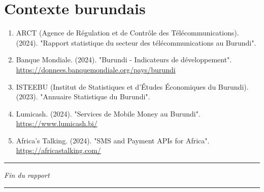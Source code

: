\section{Contexte burundais}

\begin{enumerate}
    \item ARCT (Agence de Régulation et de Contrôle des Télécommunications). (2024). "Rapport statistique du secteur des télécommunications au Burundi".

    \item Banque Mondiale. (2024). "Burundi - Indicateurs de développement". \\
    \url{https://donnees.banquemondiale.org/pays/burundi}

    \item ISTEEBU (Institut de Statistiques et d'Études Économiques du Burundi). (2023). "Annuaire Statistique du Burundi".

    \item Lumicash. (2024). "Services de Mobile Money au Burundi". \\
    \url{https://www.lumicash.bi/}

    \item Africa's Talking. (2024). "SMS and Payment APIs for Africa". \\
    \url{https://africastalking.com/}
\end{enumerate}

\vspace{2cm}

\begin{center}
\rule{0.5\textwidth}{0.4pt}

\textit{Fin du rapport}

\rule{0.5\textwidth}{0.4pt}
\end{center}



